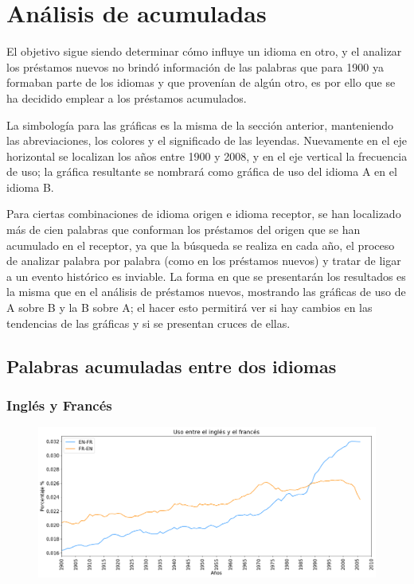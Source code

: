 \chapter{Análisis de acumuladas}

El objetivo sigue siendo determinar cómo influye un idioma en otro,  y el analizar los préstamos nuevos no brindó información de las palabras que para 1900 ya formaban parte de los idiomas y que provenían de algún otro, es por ello que se ha decidido emplear a los préstamos acumulados.  

La simbología para las gráficas es la misma de la sección anterior, manteniendo las abreviaciones, los colores y el significado de las leyendas.  Nuevamente en el eje horizontal se localizan los años  entre 1900 y 2008, y en el eje vertical la frecuencia de uso; la gráfica resultante se nombrará como gráfica de uso del idioma A en el idioma B. 

Para ciertas combinaciones de idioma origen e idioma receptor, se han localizado más de cien palabras que conforman los préstamos del origen que se han acumulado en el receptor, ya que la búsqueda se realiza en cada año, el proceso de analizar palabra por palabra (como en los préstamos nuevos) y tratar de ligar a un evento histórico es inviable. La forma en que se presentarán los resultados es la misma que en el análisis de préstamos nuevos,  mostrando las gráficas de uso de A sobre B y la B sobre A; el hacer esto permitirá ver si hay cambios en las tendencias de las gráficas y si se presentan cruces de ellas.

\newpage
\section{Palabras acumuladas entre dos idiomas}

\subsection{Inglés y Francés}

\begin{figure}[h!]
	\centering
	\includegraphics[scale=.38]{Cap_4/SF_1_S2_EN.png}
	\label{SF_EF}
	\caption{}
\end{figure}

